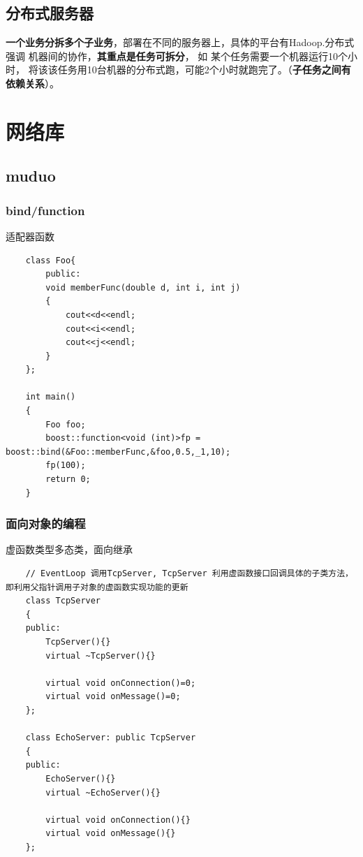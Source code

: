 \documentclass[UTF8,a4paper,8pt]{ctexbook}
\begin{document}
	\section{分布式服务器}
			\textbf{一个业务分拆多个子业务}，部署在不同的服务器上，具体的平台有Hadoop.分布式 强调 机器间的协作，\textbf{其重点是任务可拆分}， 如 某个任务需要一个机器运行10个小时， 将该该任务用10台机器的分布式跑，可能2个小时就跑完了。（\textbf{子任务之间有依赖关系}）。
\chapter{网络库}
	\section{muduo}
		\subsection{bind/function}适配器函数
			\begin{lstlisting}
	class Foo{
		public:
		void memberFunc(double d, int i, int j)
		{
			cout<<d<<endl;
			cout<<i<<endl;
			cout<<j<<endl;
		}
	};
	
	int main()
	{
		Foo foo;
		boost::function<void (int)>fp = boost::bind(&Foo::memberFunc,&foo,0.5,_1,10);
		fp(100);
		return 0;
	}
			\end{lstlisting}
		
		\subsection{面向对象的编程}虚函数类型多态类，面向继承
			\begin{lstlisting}
	// EventLoop 调用TcpServer, TcpServer 利用虚函数接口回调具体的子类方法，即利用父指针调用子对象的虚函数实现功能的更新
	class TcpServer
	{
	public:
		TcpServer(){}
		virtual ~TcpServer(){}
		
		virtual void onConnection()=0;
		virtual void onMessage()=0;
	};
	
	class EchoServer: public TcpServer
	{
	public:
		EchoServer(){}
		virtual ~EchoServer(){}
		
		virtual void onConnection(){}
		virtual void onMessage(){}		
	};		
			\end{lstlisting}
			
\end{document}
